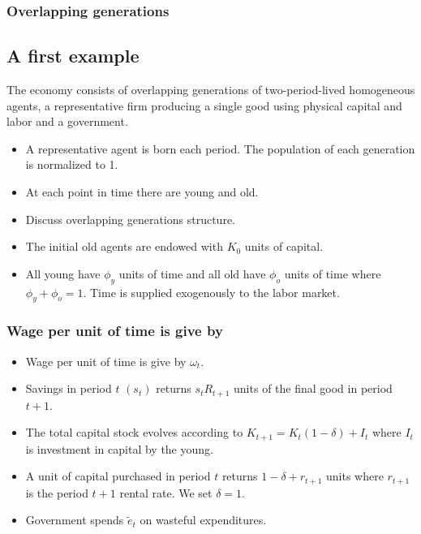 \documentclass[aspectratio=169]{ltx-talk}
\begin{document}
\begin{frame}
\frametitle{Overlapping generations}
\subsection{A first example}

The economy consists of overlapping generations of two-period-lived
homogeneous agents, a representative firm producing a single good using
physical capital and labor and a government.

\begin{itemize}
\item A representative agent is born each period. The population of each
generation is normalized to 1.

\item At each point in time there are young and old.

\item Discuss overlapping generations structure.

\item The initial old agents are endowed with $K_{0}$ units of capital$.$

\item All young have $\phi _{y}$ units of time and all old have $\phi _{o}$
units of time where $\phi _{y}+\phi _{o}=1.$ Time is supplied exogenously to
the labor market.
\end{itemize}
\end{frame}

\begin{frame}
\frametitle{Wage per unit of time is give by}
\begin{itemize}
\item Wage per unit of time is give by $\omega _{t}$.

\item Savings in period $t$ $(s_{t})$ returns $s_{t}R_{t+1}$ units of the
final good in period $t+1.$

\item The total capital stock evolves according to $K_{t+1}=K_{t}\left(
1-\delta \right) +I_{t}$ where $I_{t}$ is investment in capital by the young.

\item A unit of capital purchased in period $t$ returns $1-\delta +r_{t+1}$
units where $r_{t+1}$ is the period $t+1$ rental rate. We set $\delta =1.$

\item Government spends $\tilde{e}_{t}$ on wasteful expenditures.
\end{itemize}
\end{frame}
\end{document}
